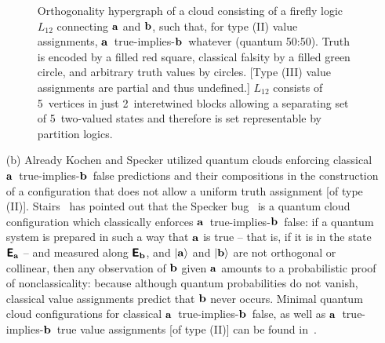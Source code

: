 \documentclass[%
  reprint,
  twocolumn,
 showpacs,
 showkeys,
 preprintnumbers,
 amsmath,amssymb,
 aps,
  prl,
  longbibliography,
 ]{revtex4-1}
\begin{document}
\begin{enumerate}
\begin{figure}
\begin{center}
\begin{tikzpicture}  [scale=0.20]
\end{tikzpicture}
\end{center}
\caption{
\label{2018-c-f-firefly}
Orthogonality hypergraph of a cloud consisting of a
firefly logic $L_{12}$ connecting ${\bf a}$ and ${\bf b}$, such that, for type (II) value assignments, ${\bf a}$~true-implies-${\bf b}$~whatever (quantum 50:50).
Truth is encoded by a filled red square, classical falsity by a filled green circle, and arbitrary truth values by circles.
[Type (III) value assignments are partial and thus undefined.]
$L_{12}$ consists of 5~vertices in just 2~interetwined blocks allowing
a separating set of 5~two-valued states and therefore is set representable by partition logics.}
\end{figure}


\item[(b)]
Already Kochen and Specker utilized quantum clouds enforcing classical ${\bf a}$~true-implies-${\bf b}$~false  predictions
and their compositions in the construction of a configuration that does not allow a uniform truth assignment [of type (II)].
Stairs~\cite[p.~588-589]{stairs83} has pointed out that the Specker bug~\cite[Fig.~1, p.~182]{kochen2}
is a quantum cloud configuration which classically enforces ${\bf a}$~true-implies-${\bf b}$~false:
if a quantum system is prepared in such a way that ${\bf a}$ is true
-- that is, if it is in the state $\textsf{\textbf{E}}_{\bf a}$ -- and measured along $\textsf{\textbf{E}}_{\bf b}$, and
$\vert {\bf a} \rangle$ and
$\vert {\bf b} \rangle$
are not orthogonal or collinear, then any observation of ${\bf b}$ given ${\bf a}$ amounts to a probabilistic proof of nonclassicality:
because although quantum probabilities do not vanish, classical value assignments predict that ${\bf b}$ never occurs.
Minimal quantum cloud configurations for classical ${\bf a}$~true-implies-${\bf b}$~false,
as well as  ${\bf a}$~true-implies-${\bf b}$~true value assignments [of type (II)] can be found in~\cite{2018-minimalYIYS}.


\end{enumerate}
\end{document}

